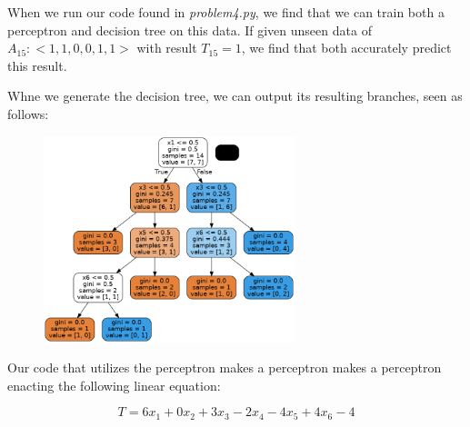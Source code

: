 \documentclass{article}
\begin{document}
When we run our code found in \textit{problem4.py}, we find that we can train both a perceptron and decision tree on this data. If given unseen data of $A_{15}:<1, 1, 0, 0, 1, 1>$ with result $T_{15}=1$, we find that both accurately predict this result.

Whne we generate the decision tree, we can output its resulting branches, seen as follows:

\begin{figure}[H]
    \centering
    \includegraphics[width = 0.65\textwidth]{tree.png}
\end{figure}

Our code that utilizes the perceptron makes a perceptron makes a perceptron enacting the following linear equation:

\begin{equation}
    T = 6x_1 + 0x_2 + 3x_3 - 2x_4 - 4x_5 + 4x_6 - 4
\end{equation}
\end{document}
